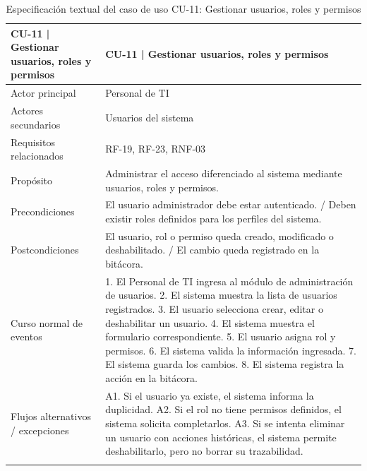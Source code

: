 \begingroup
\small
\begin{longtable}{|P{0.5000}|P{0.5000}|}
\hline
CU-11 | Gestionar usuarios, roles y permisos & CU-11 | Gestionar usuarios, roles y permisos \\ \hline
Actor principal & Personal de TI \\ \hline
Actores secundarios & Usuarios del sistema \\ \hline
Requisitos relacionados & RF-19, RF-23, RNF-03 \\ \hline
Propósito & Administrar el acceso diferenciado al sistema mediante usuarios, roles y permisos. \\ \hline
Precondiciones & El usuario administrador debe estar autenticado. / Deben existir roles definidos para los perfiles del sistema. \\ \hline
Postcondiciones & El usuario, rol o permiso queda creado, modificado o deshabilitado. / El cambio queda registrado en la bitácora. \\ \hline
Curso normal de eventos & 1. El Personal de TI ingresa al módulo de administración de usuarios. 2. El sistema muestra la lista de usuarios registrados. 3. El usuario selecciona crear, editar o deshabilitar un usuario. 4. El sistema muestra el formulario correspondiente. 5. El usuario asigna rol y permisos. 6. El sistema valida la información ingresada. 7. El sistema guarda los cambios. 8. El sistema registra la acción en la bitácora. \\ \hline
Flujos alternativos / excepciones & A1. Si el usuario ya existe, el sistema informa la duplicidad. A2. Si el rol no tiene permisos definidos, el sistema solicita completarlos. A3. Si se intenta eliminar un usuario con acciones históricas, el sistema permite deshabilitarlo, pero no borrar su trazabilidad. \\ \hline
\caption{Especificación textual del caso de uso CU-11: Gestionar usuarios, roles y permisos}
\end{longtable}
\endgroup

